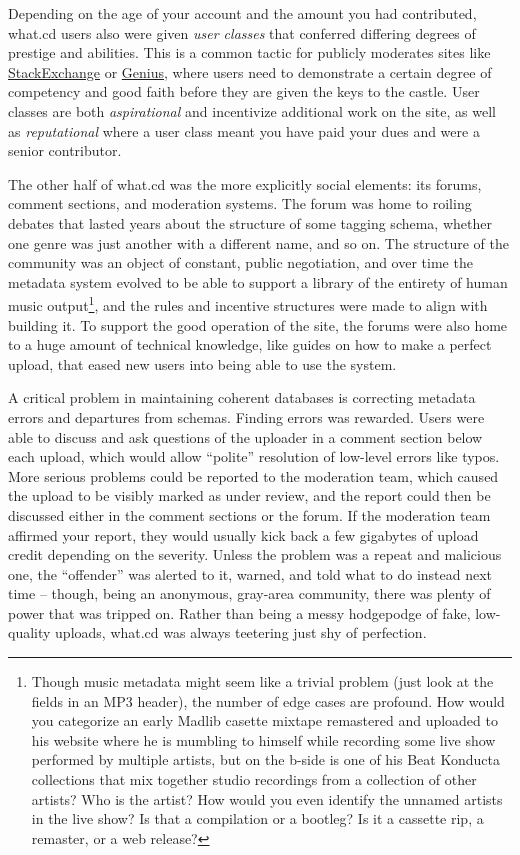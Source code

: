 \documentclass[10pt]{article}
\begin{document}
\begin{multicols}{2}
Depending on the age of your account and the amount you had contributed,
what.cd users also were given \emph{user classes} that conferred
differing degrees of prestige and abilities. This is a common tactic for
publicly moderates sites like
\href{https://stackexchange.com}{StackExchange} or
\href{https://genius.com}{Genius}, where users need to demonstrate a
certain degree of competency and good faith before they are given the
keys to the castle. User classes are both \emph{aspirational} and
incentivize additional work on the site, as well as \emph{reputational}
where a user class meant you have paid your dues and were a senior
contributor.

The other half of what.cd was the more explicitly social elements: its
forums, comment sections, and moderation systems. The forum was home to
roiling debates that lasted years about the structure of some tagging
schema, whether one genre was just another with a different name, and so
on. The structure of the community was an object of constant, public
negotiation, and over time the metadata system evolved to be able to
support a library of the entirety of human music output\footnote{Though
  music metadata might seem like a trivial problem (just look at the
  fields in an MP3 header), the number of edge cases are profound. How
  would you categorize an early Madlib casette mixtape remastered and
  uploaded to his website where he is mumbling to himself while
  recording some live show performed by multiple artists, but on the
  b-side is one of his Beat Konducta collections that mix together
  studio recordings from a collection of other artists? Who is the
  artist? How would you even identify the unnamed artists in the live
  show? Is that a compilation or a bootleg? Is it a cassette rip, a
  remaster, or a web release?}, and the rules and incentive structures
were made to align with building it. To support the good operation of
the site, the forums were also home to a huge amount of technical
knowledge, like guides on how to make a perfect upload, that eased new
users into being able to use the system.

A critical problem in maintaining coherent databases is correcting
metadata errors and departures from schemas. Finding errors was
rewarded. Users were able to discuss and ask questions of the uploader
in a comment section below each upload, which would allow ``polite''
resolution of low-level errors like typos. More serious problems could
be reported to the moderation team, which caused the upload to be
visibly marked as under review, and the report could then be discussed
either in the comment sections or the forum. If the moderation team
affirmed your report, they would usually kick back a few gigabytes of
upload credit depending on the severity. Unless the problem was a repeat
and malicious one, the ``offender'' was alerted to it, warned, and told
what to do instead next time -- though, being an anonymous, gray-area
community, there was plenty of power that was tripped on. Rather than
being a messy hodgepodge of fake, low-quality uploads, what.cd was
always teetering just shy of perfection.


\end{multicols}
\end{document}
